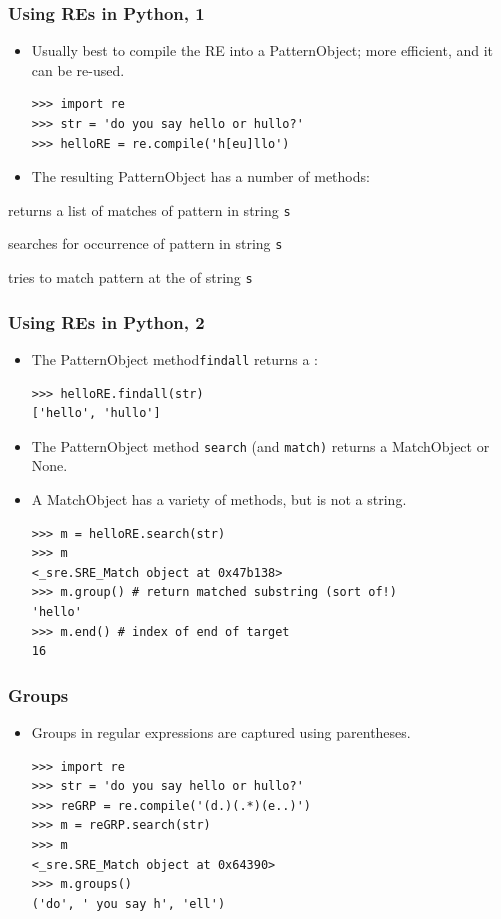 \begin{frame}[fragile]
\frametitle{Using REs in Python, 1}

\begin{itemize}[<+->]
\item Usually best to compile the RE into a PatternObject; more
  efficient, and it can be re-used.
\begin{verbatim}
>>> import re
>>> str = 'do you say hello or hullo?'
>>> helloRE = re.compile('h[eu]llo')
\end{verbatim}
\item The resulting PatternObject has a number of methods:
\end{itemize}

\begin{description}[<+->]
  \item [findall(s):] returns a list of  matches of pattern in string \texttt{s}
  \item [search(s):] searches for  occurrence of pattern in string \texttt{s}
  \item [match(s):] tries to match pattern at the  of string \texttt{s}
\end{description}

\end{frame}

\begin{frame}[fragile]
\frametitle{Using REs in Python, 2}

\begin{itemize}[<+->]
\item The PatternObject method\texttt{findall} returns a :
\begin{verbatim}
>>> helloRE.findall(str)
['hello', 'hullo']
\end{verbatim}
\item  The PatternObject method \texttt{search} (and \texttt{match)} returns a MatchObject or None.
\item A MatchObject has a variety of methods, but is not a string.
\begin{verbatim}
>>> m = helloRE.search(str)
>>> m
<_sre.SRE_Match object at 0x47b138>
>>> m.group() # return matched substring (sort of!)
'hello'
>>> m.end() # index of end of target
16
\end{verbatim}

\end{itemize}
\end{frame}


\begin{frame}[fragile]
\frametitle{Groups}

\begin{itemize}[<+->]
\item Groups in regular expressions are captured using parentheses.
\begin{verbatim}
>>> import re
>>> str = 'do you say hello or hullo?'
>>> reGRP = re.compile('(d.)(.*)(e..)')
>>> m = reGRP.search(str)
>>> m
<_sre.SRE_Match object at 0x64390>
>>> m.groups()
('do', ' you say h', 'ell')
\end{verbatim}
\end{itemize}

\end{frame}

